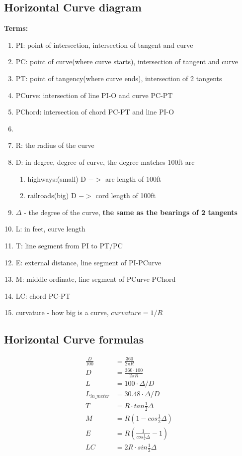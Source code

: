 \documentclass{article}
\begin{document}
  \subsection{Horizontal Curve diagram}
  \textbf{Terms:}
  \begin{enumerate}
    \item PI: point of intersection, intersection of tangent and curve
    \item PC: point of curve(where curve starts), intersection of tangent and curve
    \item PT: point of tangency(where curve ends), intersection of 2 tangents
    \item PCurve: intersection of line PI-O and curve PC-PT
    \item PChord: intersection of chord PC-PT and line PI-O
    \item 
    \item R: the radius of the curve
    \item D: in degree, degree of curve, the degree matches 100ft arc
    \begin{enumerate}
      \item highways:(small) D $->$ arc length of 100ft
      \item railroads(big) D $->$ cord length of 100ft
    \end{enumerate}

    \item $\Delta$ - the degree of the curve, \textbf{the same as the bearings of 2 tangents}
    \item L: in feet, curve length 
    \item T: line segment from PI to PT/PC
    \item E: external distance, line segment of PI-PCurve
    \item M: middle ordinate, line segment of PCurve-PChord 
    \item LC: chord PC-PT 
    \item curvature - how big is a curve, $curvature = 1/R$
  \end{enumerate}

  \subsection{Horizontal Curve formulas}
  \begin{align*}
     \frac{D}{100} & = \frac{360}{2\pi R} \\
     D & = \frac{360 \cdot 100}{2\pi R} \\
     L & = 100 \cdot \Delta / D \\
     L_{in\_meter} & = 30.48 \cdot \Delta / D \\
     T & = R \cdot tan \frac{1}{2}\Delta \\
     M & = R(1-cos \frac{1}{2} \Delta) \\
     E & = R(\frac{1}{cos \frac{1}{2} \Delta} - 1) \\
     LC & = 2R \cdot sin \frac{1}{2} \Delta \\
  \end{align*}
\end{document}
